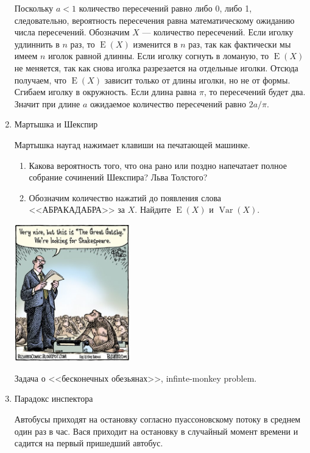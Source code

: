 \documentclass[nobib]{tufte-handout}
\DeclareMathOperator{\Var}{Var}
\DeclareMathOperator{\E}{E}
\begin{document}
\begin{enumerate}
\begin{solution}
Поскольку $a<1$ количество пересечений равно либо 0, либо 1, следовательно, вероятность пересечения равна математическому ожиданию числа пересечений. Обозначим $X$ --- количество пересечений. Если иголку удлиннить в $n$ раз, то $\E(X)$ изменится в $n$ раз, так как фактически мы имеем $n$ иголок равной длинны. Если иголку согнуть в ломаную, то $\E(X)$ не меняется, так как снова иголка разрезается на отдельные иголки. Отсюда получаем, что $\E(X)$ зависит только от длины иголки, но не от формы. Сгибаем иголку в окружность. Если длина равна $\pi$, то пересечений будет два. Значит при длине $a$ ожидаемое количество пересечений равно $2a/\pi$. 
\end{solution}



\item Мартышка и Шекспир

Мартышка наугад нажимает клавиши на печатающей машинке. 


\begin{enumerate}
\item Какова вероятность того, что она рано или поздно напечатает полное собрание сочинений Шекспира? Льва Толстого?
\item Обозначим количество нажатий до появления слова <<АБРАКАДАБРА>> за $X$. Найдите $\E(X)$ и $\Var(X)$.
\end{enumerate}


\begin{marginfigure}
  \includegraphics[width=5cm]{gatsby}
  \caption{Задача о <<бесконечных обезьянах>>, infinte-monkey problem. }
\end{marginfigure}

\item Парадокс инспектора

Автобусы приходят на остановку согласно пуассоновскому потоку в среднем один раз в час. Вася приходит на остановку в случайный момент времени и садится на первый пришедший автобус. 


\end{enumerate}
\end{document}
